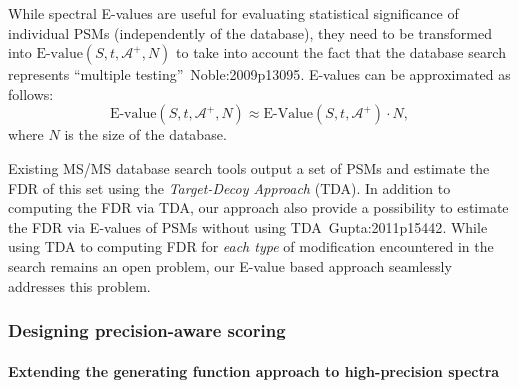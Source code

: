 While spectral E-values are useful for evaluating statistical significance of
individual
 PSMs (independently of the database), they need to be transformed into  $\textrm{E-value}(S,t,\mathcal{A}^+,N)$
to take
into account the fact that the database search represents ``multiple testing''~\cite{unv}{Noble:2009p13095}.
E-values can be approximated as follows:
$$
\textrm{E-value}(S,t,\mathcal{A}^+,N) \approx \textrm{E-Value}(S,t,\mathcal{A}^+) \cdot N,
$$
\noindent where $N$ is the size of the database.%

%


Existing MS/MS database search tools output a set of PSMs and estimate the FDR of this set 
 using the {\em Target-Decoy Approach} (TDA).  
In addition to computing the FDR via TDA, our approach 
also provide a possibility to estimate the FDR via E-values of PSMs
without using TDA~\cite{unv}{Gupta:2011p15442}.
While using TDA to computing FDR for {\em each type} of modification encountered in the search remains an open problem, our E-value based approach seamlessly addresses this problem.   



\subsubsection{Designing precision-aware scoring}

\paragraph{Extending the generating function approach to high-precision spectra} 

